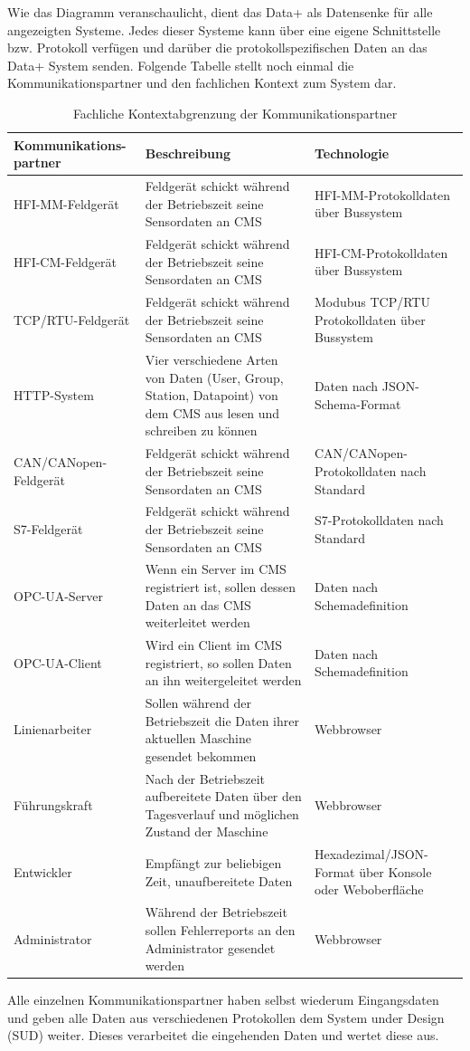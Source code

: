 Wie das Diagramm veranschaulicht, dient das Data+ als Datensenke für alle angezeigten Systeme. Jedes dieser Systeme kann über eine eigene Schnittstelle bzw. Protokoll verfügen und darüber die protokollspezifischen Daten an das Data+ System senden.
Folgende Tabelle stellt noch einmal die Kommunikationspartner und den fachlichen Kontext zum System dar.\\
\begin{table}[th]
	\begin{tabularx}{\textwidth}{|p{3.5cm}|p{7cm}|X|}
		\hline
		Kommunikations-
		partner & Beschreibung & Technologie \\
		\hline
		HFI-MM-Feldgerät &Feldgerät schickt während der Betriebszeit seine Sensordaten an CMS  & HFI-MM-Protokolldaten über Bussystem\\
		\hline
		HFI-CM-Feldgerät & Feldgerät schickt während der Betriebszeit seine Sensordaten an CMS  & HFI-CM-Protokolldaten über Bussystem\\
		\hline
		TCP/RTU-Feldgerät &Feldgerät schickt während der Betriebszeit seine Sensordaten an CMS  & Modubus TCP/RTU Protokolldaten über Bussystem \\
		\hline
		HTTP-System & Vier verschiedene Arten von Daten (User, Group, Station, Datapoint) von dem CMS aus lesen und schreiben zu können & Daten nach JSON-Schema-Format \\
		\hline
		CAN/CANopen-Feldgerät & Feldgerät schickt während der Betriebszeit seine Sensordaten an CMS  & CAN/CANopen-Protokolldaten nach Standard\\
		\hline
		S7-Feldgerät &Feldgerät schickt während der Betriebszeit seine Sensordaten an CMS  & S7-Protokolldaten nach Standard\\
		\hline
		OPC-UA-Server & Wenn ein Server im CMS registriert ist, sollen dessen Daten an das CMS weiterleitet werden & Daten nach Schemadefinition\\
		\hline
		OPC-UA-Client & Wird ein Client im CMS registriert, so sollen Daten an ihn weitergeleitet werden & Daten nach Schemadefinition\\
		\hline
		Linienarbeiter & Sollen während der Betriebszeit die Daten ihrer aktuellen Maschine gesendet bekommen & Webbrowser\\
		\hline
		Führungskraft & Nach der Betriebszeit aufbereitete Daten über den Tagesverlauf und möglichen Zustand der Maschine & Webbrowser\\
		\hline
		Entwickler & Empfängt zur beliebigen Zeit, unaufbereitete Daten & Hexadezimal/JSON-Format über Konsole oder Weboberfläche\\
		\hline
		Administrator & Während der Betriebszeit sollen Fehlerreports an den Administrator gesendet werden & Webbrowser\\
		\hline
	\end{tabularx} 
	\caption{Fachliche Kontextabgrenzung der Kommunikationspartner}
	\label{tab:FachlicheKontextabgrenzungDerKommunikationspartner}
\end{table}
Alle einzelnen Kommunikationspartner haben selbst wiederum Eingangsdaten und geben alle Daten aus verschiedenen Protokollen dem System under Design (SUD) weiter. Dieses verarbeitet die eingehenden Daten und wertet diese aus.
\clearpage
